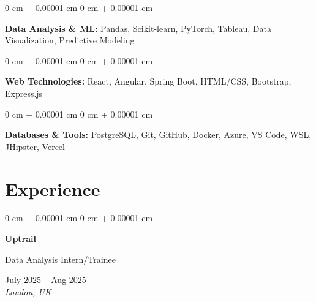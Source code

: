 \documentclass[10pt, a4paper]{article}
\newenvironment{onecolentry}{
    \begin{adjustwidth}{
        0 cm + 0.00001 cm
    }{
        0 cm + 0.00001 cm
    }
}{
    \end{adjustwidth}
} %
\newenvironment{twocolentry}[2][]{
    \onecolentry
    \def\secondColumn{#2}
    \setcolumnwidth{\fill, 4.5 cm}
    \begin{paracol}{2}
}{
    \switchcolumn \raggedleft \secondColumn
    \end{paracol}
    \endonecolentry
} %
\begin{document}
    \begin{onecolentry}
        \textbf{Data Analysis \& ML:} Pandas, Scikit-learn, PyTorch, Tableau, Data Visualization, Predictive Modeling
    \end{onecolentry}

    \vspace{0.2 cm}

    \begin{onecolentry}
        \textbf{Web Technologies:} React, Angular, Spring Boot, HTML/CSS, Bootstrap, Express.js
    \end{onecolentry}

    \vspace{0.2 cm}

    \begin{onecolentry}
        \textbf{Databases \& Tools:} PostgreSQL, Git, GitHub, Docker, Azure, VS Code, WSL, JHipster, Vercel
    \end{onecolentry}

    \vspace{0.2 cm}


    \section{Experience}

    \begin{twocolentry}{
        July 2025 -- Aug 2025 \\
        \textit{London, UK}
    }
        \textbf{Uptrail}
        
        Data Analysis Intern/Trainee
    \end{twocolentry}
\end{document}
